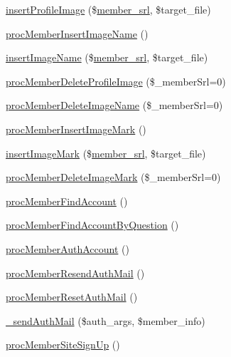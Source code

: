 \begin{DoxyCompactItemize}
\item 
\hyperlink{classmemberController_af7334a64b7530387a5f761935d042933}{insert\+Profile\+Image} (\$\hyperlink{ko_8install_8php_aa61f9e08f0fe505094d26f8143f30bbd}{member\+\_\+srl}, \$target\+\_\+file)
\item 
\hyperlink{classmemberController_a5477f3466e28c09d13f182406893a3d6}{proc\+Member\+Insert\+Image\+Name} ()
\item 
\hyperlink{classmemberController_a723651429eec4409cc58daefb508e7bf}{insert\+Image\+Name} (\$\hyperlink{ko_8install_8php_aa61f9e08f0fe505094d26f8143f30bbd}{member\+\_\+srl}, \$target\+\_\+file)
\item 
\hyperlink{classmemberController_a469c2f84ff27c0fb9fc9ae7f3b921548}{proc\+Member\+Delete\+Profile\+Image} (\$\+\_\+member\+Srl=0)
\item 
\hyperlink{classmemberController_a5b2d6f21719829dcf1b422e9958bcf48}{proc\+Member\+Delete\+Image\+Name} (\$\+\_\+member\+Srl=0)
\item 
\hyperlink{classmemberController_afcb874e178e1c13158e364b891998640}{proc\+Member\+Insert\+Image\+Mark} ()
\item 
\hyperlink{classmemberController_a99efb504d3ab31a6365434696cb7b2fb}{insert\+Image\+Mark} (\$\hyperlink{ko_8install_8php_aa61f9e08f0fe505094d26f8143f30bbd}{member\+\_\+srl}, \$target\+\_\+file)
\item 
\hyperlink{classmemberController_a22dff50295755ba06fb55d60104dbb32}{proc\+Member\+Delete\+Image\+Mark} (\$\+\_\+member\+Srl=0)
\item 
\hyperlink{classmemberController_a6ba64b98fa5d0fd55435e464f02d050e}{proc\+Member\+Find\+Account} ()
\item 
\hyperlink{classmemberController_a1141d3b40fc5927dcbaff3b4b4b11bff}{proc\+Member\+Find\+Account\+By\+Question} ()
\item 
\hyperlink{classmemberController_a2dfdfbe05e0248b65c9aadf969195c12}{proc\+Member\+Auth\+Account} ()
\item 
\hyperlink{classmemberController_aa0e4416a4e98fc31701ba68581b7c14b}{proc\+Member\+Resend\+Auth\+Mail} ()
\item 
\hyperlink{classmemberController_ab0515bd2aae55dbda2049d39612ef6b2}{proc\+Member\+Reset\+Auth\+Mail} ()
\item 
\hyperlink{classmemberController_a8768cc1066bf70222fdd0f0fa2d55d31}{\+\_\+send\+Auth\+Mail} (\$auth\+\_\+args, \$member\+\_\+info)
\item 
\hyperlink{classmemberController_a4dfc326f5bc6d97b86b919c568457000}{proc\+Member\+Site\+Sign\+Up} ()

\end{DoxyCompactItemize}
